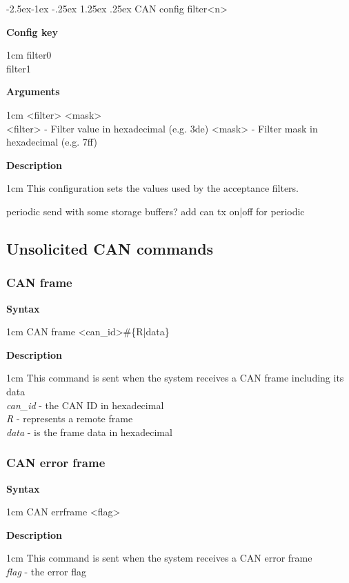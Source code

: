 \documentclass{article}[a4paper]
\makeatletter
\newcommand\subsubsubsection{\@startsection{paragraph}{4}{\z@}%
            {-2.5ex\@plus -1ex \@minus -.25ex}%
            {1.25ex \@plus .25ex}%
            {\normalfont\normalsize\bfseries}}
\makeatother
\begin{document}
\subsubsubsection{CAN config filter<n>}
\begin{tcolorbox}
	{\bf Config key}

	 1cm \dimexpr\linewidth-2cm\relax
	filter0 \\
	filter1

	\medskip
	{\bf Arguments}

	 1cm \dimexpr\linewidth-2cm\relax
	<filter> <mask> \\
	<filter> - Filter value in hexadecimal (e.g. 3de)
	<mask> - Filter mask in hexadecimal (e.g. 7ff)

	\medskip
	{\bf Description}

	 1cm \dimexpr\linewidth-2cm\relax
	This configuration sets the values used by the acceptance filters.
\end{tcolorbox}

periodic send with some storage buffers? add can tx {on|off} for periodic

\subsection{Unsolicited CAN commands}

\subsubsection{CAN frame}
\begin{tcolorbox}
	{\bf Syntax}

	 1cm \dimexpr\linewidth-2cm\relax
	CAN frame <can\_id>\#\{R|data\}

	\medskip
	{\bf Description}

	 1cm \dimexpr\linewidth-2cm\relax
	This command is sent when the system receives a CAN frame including its data
	\medskip \\
	{\it can\_id} - the CAN ID in hexadecimal \\
	{\it R} - represents a remote frame \\
	{\it data} - is the frame data in hexadecimal
\end{tcolorbox}

\subsubsection{CAN error frame}
\begin{tcolorbox}
	{\bf Syntax}

	 1cm \dimexpr\linewidth-2cm\relax
	CAN errframe <flag>

	\medskip
	{\bf Description}

	 1cm \dimexpr\linewidth-2cm\relax
	This command is sent when the system receives a CAN error frame
	\medskip \\
	{\it flag} - the error flag
\end{tcolorbox}
\end{document}
